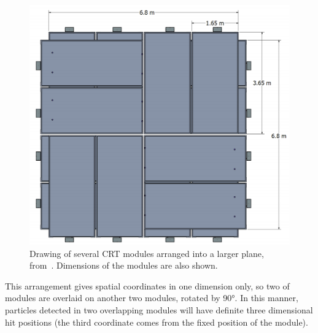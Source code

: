 \begin{figure}[h]
	\centering
	\includegraphics[width=.6\linewidth]{files/figures/protodune_detector/crtModules}
	\caption[Drawing of several CRT modules arranged into a larger plane]{Drawing of several CRT modules arranged into a larger plane, from~\cite{protodunePerformance}. Dimensions of the modules are also shown.}
	\label{fig:crtModules}
\end{figure}

This arrangement gives spatial coordinates in one dimension only, so two of modules are overlaid on another two modules, rotated by \ang{90}. 
In this manner, particles detected in two overlapping modules will have definite three dimensional hit positions (the third coordinate comes from the fixed position of the module).

